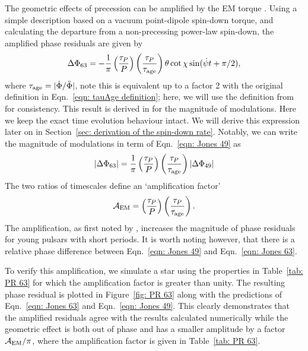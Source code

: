 \documentclass[../full_thesis/full_thesis.tex]{subfiles}
\begin{document}
The geometric effects of precession can be amplified by the EM torque \citep{Cordes1993}.
Using a simple description based on a vacuum point-dipole spin-down torque,
and calculating the departure from a non-precessing power-law spin-down,
the amplified phase residuals are given by
\begin{align}
\Delta\Phi_{63} = -\frac{1}{\pi}\left(\frac{\tau_{P}}{P}\right)
                               \left(\frac{\tau_{P}}{\tau_{\mathrm{age}}}\right)
                               \theta
                               \cot\chi
                               \sin(\dot{\psi} t + \pi/2),
\label{eqn: Jones 63}
\end{align}
where $\tau_{\mathrm{age}}=|\dot{\Phi}/\ddot{\Phi}|$, note this is equivalent up to a factor
2 with the original definition in Eqn.~\eqref{eqn: tauAge definition}; here,
we will use the definition from \citet{Jones2001} for consistency.
This result is derived in \citet{Jones2001} for the magnitude of modulations.
Here we keep the exact time evolution behaviour intact. We will derive this
expression later on in Section~\ref{sec: derivation of the spin-down rate}.
Notably, we can write the magnitude of modulations in term of Eqn.~\eqref{eqn:
Jones 49} as
\begin{equation}
    |\Delta\Phi_{63}| = \frac{1}{\pi}\left(\frac{\tau_{P}}{P}\right)
    \left(\frac{\tau_{P}}{\tau_{\mathrm{age}}}\right)
                                    |\Delta\Phi_{49}|
\label{eqn: Jones 63 mag}
\end{equation}
The two ratios of timescales define an `amplification factor'
\begin{equation}
    \mathcal{A}_{\mathrm{EM}} = \left(\frac{\tau_{P}}{P}\right)
                                \left(\frac{\tau_{P}}{\tau_{\mathrm{age}}}\right).
\label{eqn: EM amplification}
\end{equation}
The amplification, as first noted by \citet{Cordes1993}, increases the
magnitude of phase residuals for young pulsars with short periods. It is worth
noting however, that there is a relative phase difference between
Eqn.~\eqref{eqn: Jones 49} and Eqn.~\eqref{eqn: Jones 63}.

To verify this amplification, we simulate a star using the properties in
Table~\ref{tab: PR 63} for which the amplification factor is greater than
unity.
The resulting phase residual is plotted in Figure~\ref{fig: PR 63} along with the
predictions of Eqn.~\eqref{eqn: Jones 63} and Eqn.~\eqref{eqn: Jones 49}. This
clearly demonstrates that the amplified residuals agree with the results
calculated numerically while the geometric effect is both out of phase and
has a smaller amplitude by a factor $\mathcal{A}_{\mathrm{EM}}/\pi$, where the amplification factor is
given in Table~\ref{tab: PR 63}.
\end{document}
